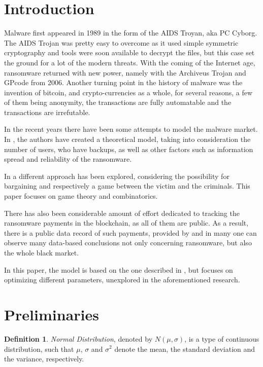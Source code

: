 \documentclass[11pt, a4paper]{article}
\theoremstyle{definition}
\newtheorem{definition}{Definition}
\begin{document}
\section{Introduction}
		Malware first appeared in 1989 in the form of the AIDS Troyan, aka PC Cyborg.  The AIDS Trojan was pretty easy to overcome as it used simple symmetric cryptography and tools were soon available to decrypt the files, but this case set the ground for a lot of the modern threats. With the coming of the Internet age, ransomware returned with new power, namely with the Archiveus Trojan and GPcode from 2006. Another turning point in the history of malware was the invention of bitcoin, and crypto-currencies as a whole, for several reasons, a few of them being anonymity, the transactions are fully automatable and the transactions are irrefutable\cite{huang2018tracking}.\par
		In the recent years there have been some attempts to model the malware market. In \cite{caulfielddynamic}, the authors have created a theoretical model, taking into consideration the number of users, who have backups, as well as other factors such as information spread and reliability of the ransomware.\par                 
		In \cite{cartwright2018pay} a different approach has been explored, considering the possibility for bargaining and respectively a game between the victim and the criminals. This paper focuses on game theory and combinatorics.\par
		There has also been considerable amount of effort dedicated to tracking the ransomware payments in the blockchain, as all of them are public. As a result, there is a public data record of such payments, provided by \cite{paquet2019ransomware} and in \cite{thomas2015framing} many one can observe many data-based conclusions not only concerning ransomware, but also the whole black market.\par
		In this paper, the model is based on the one described in \cite{caulfielddynamic}, but focuses on optimizing different parameters, unexplored in the aforementioned research.
\newpage
	\section{Preliminaries}
		\begin{definition}
			\label{def:normdist}
			\emph{Normal Distribution}, denoted by $N(\mu, \sigma)$, is a type of continuous distribution, such that $\mu$, $\sigma$ and $\sigma^{2}$ denote the mean, the standard deviation and the variance, respectively.
		\end{definition}
	
\end{document}
